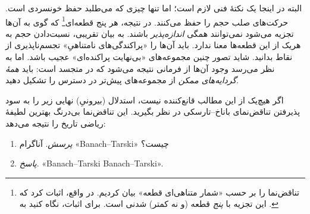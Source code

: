 \documentclass[../../../include/open-logic-section]{subfiles}
\begin{document}
البته در اینجا یک نکتهٔ فنی لازم است؛ اما تنها چیزی که می‌طلبد حفظ
خونسردی است. حرکت‌های صلب حجم را حفظ می‌کنند. در نتیجه، هر پنج
قطعه‌ای\footnote{تناقض‌نما را بر حسب «شمار متناهی‌ای قطعه» بیان
کردیم. در واقع، \citet{Robinson1947} اثبات کرد که این تجزیه با
\emph{پنج} قطعه (و نه کمتر) شدنی است. برای اثبات، نگاه کنید به
\citet[pp.~66--7]{Wagon2016}.} که گوی به آن‌ها تجزیه می‌شود
نمی‌توانند همگی \emph{اندازه‌پذیر} باشند. به بیان تقریبی، نسبت‌دادن
حجم به هریک از این قطعه‌ها معنا ندارد. باید آن‌ها را «پراکندگی‌های
نامتناهیِ» تجسم‌ناپذیری از نقاط بدانید. شاید تصور چنین مجموعه‌های
«بی‌نهایت پراکنده‌ای» عجیب باشد. اما به نظر می‌رسد وجود آن‌ها از
فرمانی نتیجه می‌شود که در \stagesacc{} متجسد است: باید \emph{همهٔ
گردایه‌های ممکن} از مجموعه‌های پیش‌تر در دسترس را تشکیل دهید.

اگر هیچ‌یک از این مطالب قانع‌کننده نیست، استدلال (بیرونیِ) نهایی زیر
را به سود پذیرفتن تناقض‌نمای باناخ--تارسکی در نظر بگیرید. این
تناقض‌نما بی‌درنگ بهترین لطیفهٔ ریاضی تاریخ را نتیجه می‌دهد:
\begin{enumerate}
	\item[] \emph{پرسش}. آناگرام «Banach--Tarski» چیست؟
	\item[] \emph{پاسخ}. «Banach--Tarski Banach--Tarski».
\end{enumerate}
\end{document}
